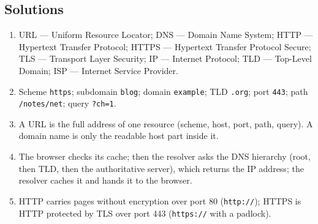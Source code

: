 \documentclass[11pt]{article}
\begin{document}
\subsection*{Solutions}
\begingroup\small
\begin{enumerate}[label=\arabic*.]
  \item URL --- Uniform Resource Locator; DNS --- Domain Name System; HTTP
    --- Hypertext Transfer Protocol; HTTPS --- Hypertext Transfer Protocol
    Secure; TLS --- Transport Layer Security; IP --- Internet Protocol; TLD
    --- Top-Level Domain; ISP --- Internet Service Provider.
  \item Scheme \texttt{https}; subdomain \texttt{blog}; domain
    \texttt{example}; TLD \texttt{.org}; port \texttt{443}; path
    \texttt{/notes/net}; query \texttt{?ch=1}.
  \item A URL is the full address of one resource (scheme, host, port,
    path, query). A domain name is only the readable host part inside it.
  \item The browser checks its cache; then the resolver asks the DNS
    hierarchy (root, then TLD, then the authoritative server), which returns
    the IP address; the resolver caches it and hands it to the browser.
  \item HTTP carries pages without encryption over port 80
    (\texttt{http://}); HTTPS is HTTP protected by TLS over port 443
    (\texttt{https://} with a padlock).
\end{enumerate}
\endgroup
\end{document}
